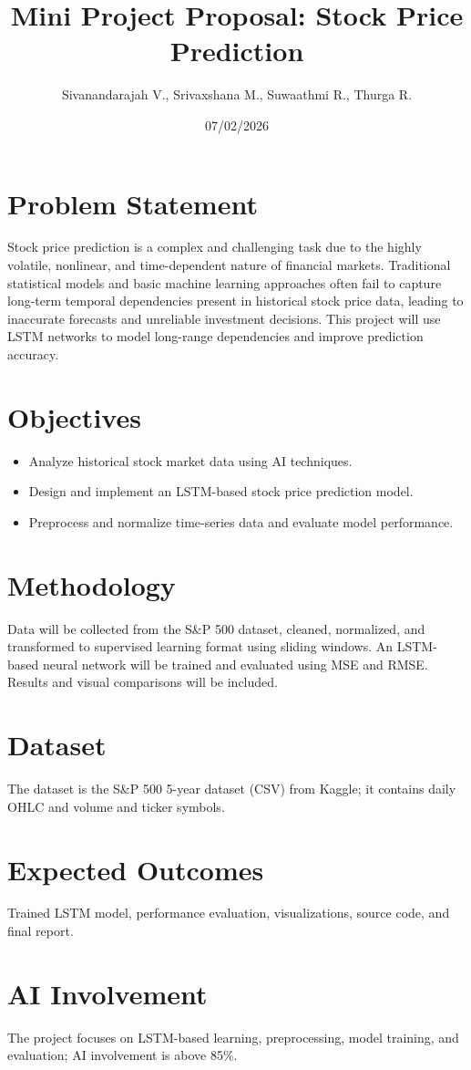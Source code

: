 \documentclass[12pt]{article}
\title{Mini Project Proposal: Stock Price Prediction}
\author{Sivanandarajah V., Srivaxshana M., Suwaathmi R., Thurga R.}
\date{07/02/2026}
\begin{document}
\maketitle
\tableofcontents
\section{Problem Statement}
Stock price prediction is a complex and challenging task due to the highly volatile, nonlinear, and time-dependent nature of financial markets. Traditional statistical models and basic machine learning approaches often fail to capture long-term temporal dependencies present in historical stock price data, leading to inaccurate forecasts and unreliable investment decisions. This project will use LSTM networks to model long-range dependencies and improve prediction accuracy.
\section{Objectives}
\begin{itemize}
  \item Analyze historical stock market data using AI techniques.
  \item Design and implement an LSTM-based stock price prediction model.
  \item Preprocess and normalize time-series data and evaluate model performance.
\end{itemize}
\section{Methodology}
Data will be collected from the S\&P 500 dataset, cleaned, normalized, and transformed to supervised learning format using sliding windows. An LSTM-based neural network will be trained and evaluated using MSE and RMSE. Results and visual comparisons will be included.
\section{Dataset}
The dataset is the S\&P 500 5-year dataset (CSV) from Kaggle; it contains daily OHLC and volume and ticker symbols.
\section{Expected Outcomes}
Trained LSTM model, performance evaluation, visualizations, source code, and final report.
\section{AI Involvement}
The project focuses on LSTM-based learning, preprocessing, model training, and evaluation; AI involvement is above 85\%.
\end{document}
